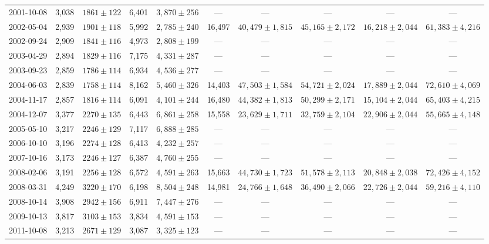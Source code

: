 \begin{landscape}
\begin{longtable}{cccccccccc}
{2001-10-08} & 3,038 & {$1861  \pm  122$} & 6,401 & {$3,870 \pm 256$} & --- & --- & --- & --- & --- \\
{2002-05-04} & 2,939 & {$1901  \pm  118$} & 5,992 & {$2,785 \pm 240$} & 16,497 & {$40,479 \pm 1,815$} & {$45,165 \pm 2,172$} & {$16,218 \pm 2,044$} & {$61,383 \pm 4,216$} \\
{2002-09-24} & 2,909 & {$1841  \pm  116$} & 4,973 & {$2,808 \pm 199$} & --- & --- & --- & --- & --- \\
{2003-04-29} & 2,894 & {$1829  \pm  116$} & 7,175 & {$4,331 \pm 287$} & --- & --- & --- & --- & --- \\
{2003-09-23} & 2,859 & {$1786  \pm  114$} & 6,934 & {$4,536 \pm 277$} & --- & --- & --- & --- & --- \\
{2004-06-03} & 2,839 & {$1758  \pm  114$} & 8,162 & {$5,460 \pm 326$} & 14,403 & {$47,503 \pm 1,584$} & {$54,721 \pm 2,024$} & {$17,889 \pm 2,044$} & {$72,610 \pm 4,069$} \\
{2004-11-17} & 2,857 & {$1816  \pm  114$} & 6,091 & {$4,101 \pm 244$} & 16,480 & {$44,382 \pm 1,813$} & {$50,299 \pm 2,171$} & {$15,104 \pm 2,044$} & {$65,403 \pm 4,215$} \\
{2004-12-07} & 3,377 & {$2270  \pm  135$} & 6,443 & {$6,861 \pm 258$} & 15,558 & {$23,629 \pm 1,711$} & {$32,759 \pm 2,104$} & {$22,906 \pm 2,044$} & {$55,665 \pm 4,148$} \\
{2005-05-10} & 3,217 & {$2246  \pm  129$} & 7,117 & {$6,888 \pm 285$} & --- & --- & --- & --- & --- \\
{2006-10-10} & 3,196 & {$2274  \pm  128$} & 6,413 & {$4,232 \pm 257$} & --- & --- & --- & --- & --- \\
{2007-10-16} & 3,173 & {$2246  \pm  127$} & 6,387 & {$4,760 \pm 255$} & --- & --- & --- & --- & --- \\
{2008-02-06} & 3,191 & {$2256  \pm  128$} & 6,572 & {$4,591 \pm 263$} & 15,663 & {$44,730 \pm 1,723$} & {$51,578 \pm 2,113$} & {$20,848 \pm 2,038$} & {$72,426 \pm 4,152$} \\
{2008-03-31} & 4,249 & {$3220  \pm  170$} & 6,198 & {$8,504 \pm 248$} & 14,981 & {$24,766 \pm 1,648$} & {$36,490 \pm 2,066$} & {$22,726 \pm 2,044$} & {$59,216 \pm 4,110$} \\
{2008-10-14} & 3,908 & {$2942  \pm  156$} & 6,911 & {$7,447 \pm 276$} & --- & --- & --- & --- & --- \\
{2009-10-13} & 3,817 & {$3103  \pm  153$} & 3,834 & {$4,591 \pm 153$} & --- & --- & --- & --- & --- \\
{2011-10-08} & 3,213 & {$2671  \pm  129$} & 3,087 & {$3,325 \pm 123$} & --- & --- & --- & --- & --- \\

\end{longtable}
\end{landscape}
